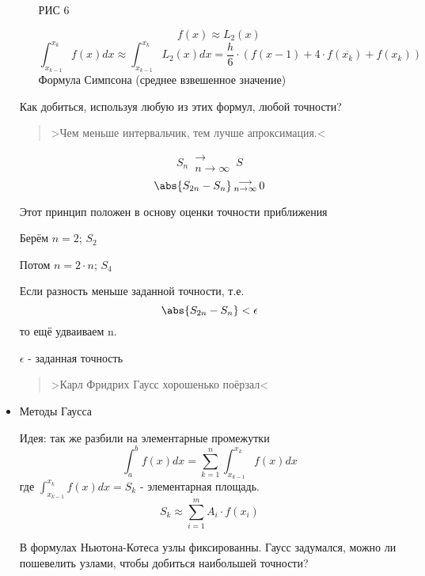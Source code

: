 \documentclass[12pt]{article}
\begin{document}
\begin{itemize}
\begin{itemize}
            РИС 6

            \[
              f(x) \approx L_2(x)
            \] 
            \[
              \int_{x_{k-1}}^{x_k} f(x)dx \approx
              \int_{x_{k-1}}^{x_k} L_2(x)dx =
              \frac{h}{6} \cdot (f(x-1) + 4 \cdot f(\overline{x_k}) + f(x_k))
            \] 
            Формула Симпсона (среднее взвешенное значение)

        \end{itemize}
        Как добиться, используя любую из этих формул, любой точности?  
        \begin{quotation}
          >Чем меньше интервальчик, тем лучше апроксимация.<
        \end{quotation}
        \[
          S_n \hspace{2pt} \substack{\longrightarrow \\ n \to \infty}
          \hspace{2pt} S
        \] 
        \[
          \abs{S_{2n} - S_n} \hspace{2pt}
          \substack{\longrightarrow \\ n \to \infty}
          \hspace{2pt} 0
        \] 

        Этот принцип положен в основу оценки точности приближения
        
        Берём \( n=2 \); \( S_2 \)

        Потом \( n=2 \cdot n \); \( S_4 \)

        Если разность меньше заданной точности, т.е.
        \[
          \abs{S_{2n} - S_n} < \epsilon
        \] 
        то ещё удваиваем n.

        \( \epsilon \) - заданная точность

        \begin{quotation}
          >Карл Фридрих Гаусс хорошенько поёрзал<
        \end{quotation}
  \item Методы Гаусса
      
    Идея: так же разбили на элементарные промежутки
    \[
      \int_{a}^{b} f(x) dx = \sum_{k=1}^{n} \int_{x_{k-1}}^{x_k} f(x)dx
    \] 
    где \( \displaystyle\int_{x_{k-1}}^{x_k} f(x)dx = S_k \) - элементарная площадь.
    \[
      S_k \approx \sum_{i=1}^{m} A_i \cdot f(x_i)
    \] 

    В формулах Ньютона-Котеса узлы фиксированны. 
    Гаусс задумался, можно ли пошевелить узлами, чтобы добиться наибольшей
    точности?


\end{itemize}
\end{document}

